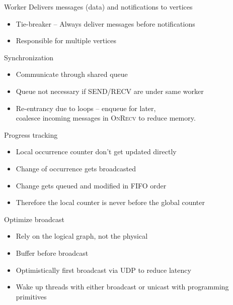 \begin{frame}[t]{Worker}
  \vspace{0.15cm}
  Delivers messages (data) and notifications to vertices

  \begin{itemize}\setlength\itemsep{0.25cm}
    \item Tie-breaker -- Always deliver messages before notifications
    \item Responsible for multiple vertices
  \end{itemize}

  \vspace{0.25cm}
  Synchronization
  \begin{itemize}\setlength\itemsep{0.25cm}
    \item Communicate through shared queue
    \item Queue not necessary if \textsc{SEND/RECV} are under same worker
    \item Re-entrancy due to loops -- enqueue for later, \\
          coalesce incoming messages in \textsc{OnRecv} to reduce memory.
  \end{itemize}

\end{frame}

\begin{frame}[t]{Progress tracking}
\vspace{0.15cm}
  \begin{itemize}\setlength\itemsep{0.25cm}
     \item Local occurrence counter don't get updated directly
     \item Change of occurrence gets broadcasted
     \item Change gets queued and modified in FIFO order
     \item Therefore the local counter is never before the global counter
   \end{itemize}
\pause

  \vspace{0.25cm}
  Optimize broadcast
   \begin{itemize}\setlength\itemsep{0.25cm}
     \item Rely on the logical graph, not the physical
     \item Buffer before broadcast
     \item Optimistically first broadcast via UDP to reduce latency
     \item Wake up threads with either broadcast or unicast with programming primitives
   \end{itemize}

\end{frame}

